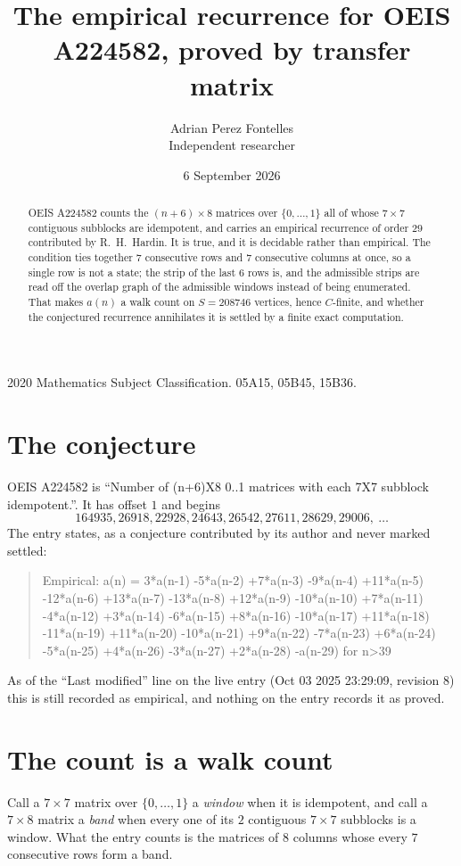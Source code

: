 \documentclass[11pt,a4paper]{article}
\title{The empirical recurrence for OEIS A224582, proved by transfer matrix}
\author{Adrian Perez Fontelles\\ \small Independent researcher}
\date{6 September 2026}
\theoremstyle{plain}
\theoremstyle{definition}
\begin{document}
\maketitle

\begin{abstract}
OEIS A224582 counts the $(n+6)\times8$ matrices over $\{0,\dots,1\}$ all of whose
$7\times7$ contiguous subblocks are idempotent, and carries an empirical recurrence of order
$29$ contributed by R.~H.~Hardin. It is true, and it is decidable rather than empirical.
The condition ties together $7$ consecutive rows and $7$ consecutive columns at once, so a
single row is not a state; the strip of the last $6$ rows is, and the admissible strips
are read off the overlap graph of the admissible windows instead of being enumerated. That
makes $a(n)$ a walk count on $S=208746$ vertices, hence $C$-finite, and whether the conjectured
recurrence annihilates it is settled by a finite exact computation.
\end{abstract}

\noindent\small 2020 Mathematics Subject Classification. 05A15, 05B45, 15B36.\normalsize

\section{The conjecture}

OEIS A224582 is ``Number of (n+6)X8 0..1 matrices with each 7X7 subblock idempotent.''. It has offset $1$ and begins
\[
164935, 26918, 22928, 24643, 26542, 27611, 28629, 29006,\ \dots
\]
The entry states, as a conjecture contributed by its author and never marked settled:
\begin{quote}
Empirical: a(n) = 3*a(n-1) -5*a(n-2) +7*a(n-3) -9*a(n-4) +11*a(n-5) -12*a(n-6) +13*a(n-7) -13*a(n-8) +12*a(n-9) -10*a(n-10) +7*a(n-11) -4*a(n-12) +3*a(n-14) -6*a(n-15) +8*a(n-16) -10*a(n-17) +11*a(n-18) -11*a(n-19) +11*a(n-20) -10*a(n-21) +9*a(n-22) -7*a(n-23) +6*a(n-24) -5*a(n-25) +4*a(n-26) -3*a(n-27) +2*a(n-28) -a(n-29) for n>39
\end{quote}
As of the ``Last modified'' line on the live entry (Oct 03 2025 23:29:09, revision 8) this is still
recorded as empirical, and nothing on the entry records it as proved.

\section{The count is a walk count}

Call a $7\times7$ matrix over $\{0,\dots,1\}$ a \emph{window} when it is idempotent, and
call a $7\times8$ matrix a \emph{band} when every one of its $2$ contiguous
$7\times7$ subblocks is a window. What the entry counts is the matrices of $8$ columns
whose every $7$ consecutive rows form a band.
\end{document}
